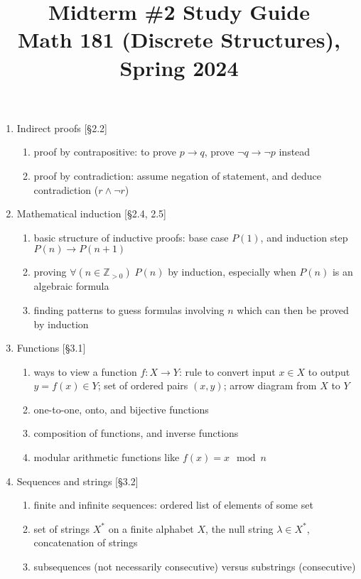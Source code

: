 \documentclass[11pt]{article}
\title{Midterm \#2 Study Guide \\Math 181 (Discrete Structures), Spring 2024}
\date{}
\begin{document}
\maketitle

\thispagestyle{empty}

\vspace{-1cm}

\begin{enumerate}
\item Indirect proofs [\S2.2] 
\begin{enumerate}
\item proof by contrapositive: to prove $p \to q$, prove $\neg q \to \neg p$ instead
\item proof by contradiction: assume negation of statement, and deduce contradiction ($r \wedge \neg r$)
\end{enumerate}

\item Mathematical induction [\S2.4, 2.5]
\begin{enumerate}
\item basic structure of inductive proofs: base case $P(1)$, and induction step $P(n) \to P(n+1)$
\item proving $\forall (n \in \mathbb{Z}_{>0}) \; P(n)$ by induction, especially when $P(n)$ is an algebraic formula
\item finding patterns to guess formulas involving $n$ which can then be proved by induction
\end{enumerate}

\item Functions [\S3.1]
\begin{enumerate}
\item ways to view a function $f\colon X \to Y$: rule to convert input $x\in X$ to output $y=f(x)\in Y$; set of ordered pairs $(x,y)$; arrow diagram from $X$ to $Y$
\item one-to-one, onto, and bijective functions
\item composition of functions, and inverse functions
\item modular arithmetic functions like $f(x) = x \mod n$
\end{enumerate}

\item Sequences and strings [\S3.2]
\begin{enumerate}
\item finite and infinite sequences: ordered list of elements of some set
\item set of strings $X^*$ on a finite alphabet $X$, the null string $\lambda \in X^*$, concatenation of strings
\item subsequences (not necessarily consecutive) versus substrings (consecutive)
\end{enumerate}


\end{enumerate}
\end{document}
